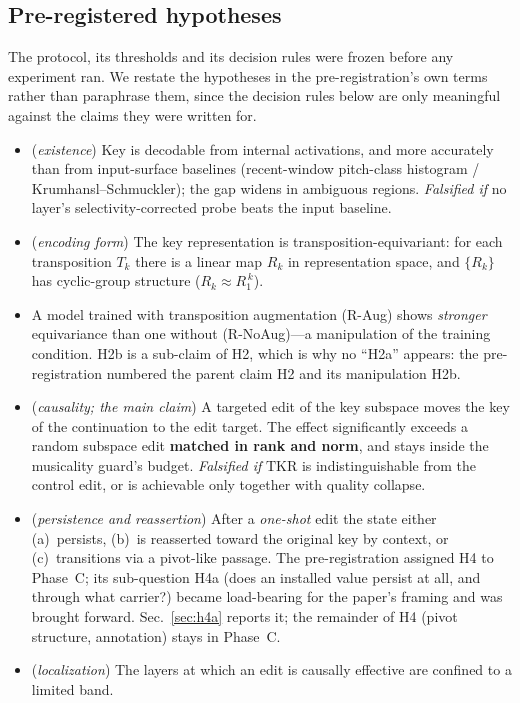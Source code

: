 \documentclass[conference]{IEEEtran}
\newcommand{\tkr}{\mathrm{TKR}}
\begin{document}
\subsection{Pre-registered hypotheses}
\label{sec:hyp}
The protocol, its thresholds and its decision rules were frozen before any experiment
ran. We restate the hypotheses in the pre-registration's own terms rather than
paraphrase them, since the decision rules below are only meaningful against the claims
they were written for.

\begin{itemize}\itemsep2pt
\item[\textbf{H1}] (\emph{existence}) Key is decodable from internal activations, and
more accurately than from input-surface baselines (recent-window pitch-class histogram
/ Krumhansl--Schmuckler); the gap widens in ambiguous regions. \emph{Falsified if} no
layer's selectivity-corrected probe beats the input baseline.
\item[\textbf{H2}] (\emph{encoding form}) The key representation is
transposition-equivariant: for each transposition $T_k$ there is a linear map $R_k$ in
representation space, and $\{R_k\}$ has cyclic-group structure ($R_k \approx R_1^{\,k}$).
\item[\textbf{H2b}] A model trained with transposition augmentation (R-Aug) shows
\emph{stronger} equivariance than one without (R-NoAug)---a manipulation of the training
condition. H2b is a sub-claim of H2, which is why no ``H2a'' appears: the
pre-registration numbered the parent claim H2 and its manipulation H2b.
\item[\textbf{H3}] (\emph{causality; the main claim}) A targeted edit of the key
subspace moves the key of the continuation to the edit target. The effect significantly
exceeds a random subspace edit \textbf{matched in rank and norm}, and stays inside the
musicality guard's budget. \emph{Falsified if} $\tkr$ is indistinguishable from the
control edit, or is achievable only together with quality collapse.
\item[\textbf{H4}] (\emph{persistence and reassertion}) After a \emph{one-shot} edit the
state either (a)~persists, (b)~is reasserted toward the original key by context, or
(c)~transitions via a pivot-like passage. The pre-registration assigned H4 to
Phase~C; its sub-question H4a (does an installed value persist at all, and through
what carrier?) became load-bearing for the paper's framing and was brought forward.
Sec.~\ref{sec:h4a} reports it; the remainder of H4 (pivot structure, annotation)
stays in Phase~C.
\item[\textbf{H5}] (\emph{localization}) The layers at which an edit is causally
effective are confined to a limited band.
\end{itemize}
\end{document}
